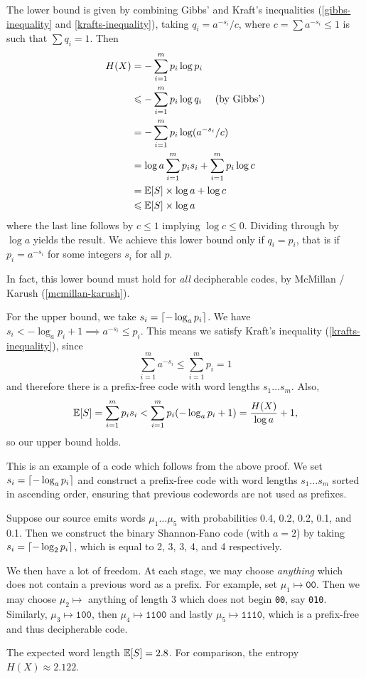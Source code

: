 \documentclass{article}
\begin{document}
\begin{prf}
    The lower bound is given by combining Gibbs' and Kraft's inequalities (\ref{gibbs-inequality} and \ref{krafts-inequality}), taking $q_i = a^{-s_i}/c$, where $c = \sum a^{-s_i} \leq 1$ is such that $\sum q_i = 1$. Then
    \begin{align*}
    	H(X) &= - \sum_{i=1}^m p_i \log p_i \\
    	&\leqslant - \sum_{i=1}^m p_i \log q_i \quad \text{ (by Gibbs')} \\
    	&= - \sum_{i=1}^m p_i \log (a^{-s_i}/c) \\
    	&= \log a \sum_{i=1}^m p_i s_i + \sum_{i=1}^m p_i \log c \\
    	&= \mathbb{E}[S] \times \log a + \log c \\
    	&\leqslant  \mathbb{E}[S] \times \log a
	\end{align*}
	where the last line follows by $c \leq 1$ implying $\log c \leq 0$. Dividing through by $\log a$ yields the result.
	We achieve this lower bound only if $q_i = p_i$, that is if $p_i = a^{-s_i}$ for some integers $s_i$ for all $p$.
	
	In fact, this lower bound must hold for \textit{all} decipherable codes, by McMillan / Karush (\ref{mcmillan-karush}).
	
	For the upper bound, we take $s_i = \left\lceil-\log_a p_i\right\rceil$. We have $s_i < - \log_a p_i + 1 \implies a^{-s_i} \leq p_i$. This means we satisfy Kraft's inequality (\ref{krafts-inequality}), since
	\[
	\sum_{i=1}^m a^{-s_i} \leq \sum_{i=1}^m p_i = 1
	\]
	and therefore there is a prefix-free code with word lengths $s_1 \dots s_m$. Also,
	\[
	\mathbb{E}[S] = \sum_{i=1}^m p_i s_i < \sum_{i=1}^m p_i (-\log_a p_i + 1) = \frac{H(X)}{\log a} + 1,
	\]
	so our upper bound holds.
\end{prf}

\begin{example}
    This is an example of a code which follows from the above proof. We set $s_i = \left\lceil- \log_a p_i\right\rceil$ and construct a prefix-free code with word lengths $s_1 \dots s_m$ sorted in ascending order, ensuring that previous codewords are not used as prefixes.
    
    Suppose our source emits words $\mu_1 \dots \mu_5$ with probabilities 0.4, 0.2, 0.2, 0.1, and 0.1. Then we construct the binary Shannon-Fano code (with $a=2$) by taking $s_i = \left\lceil-\log_2 p_i\right\rceil$, which is equal to 2, 3, 3, 4, and 4 respectively.
    
    We then have a lot of freedom. At each stage, we may choose \textit{anything} which does not contain a previous word as a prefix. For example, set $\mu_1 \mapsto \texttt{00}$. Then we may choose $\mu_2 \mapsto$ anything of length 3 which does not begin \texttt{00}, say \texttt{010}. Similarly, $\mu_3 \mapsto \texttt{100}$, then $\mu_4 \mapsto \texttt{1100}$ and lastly $\mu_5 \mapsto \texttt{1110}$, which is a prefix-free and thus decipherable code.
    
    The expected word length $\mathbb{E}[S] = 2.8$. For comparison, the entropy $H(X) \approx 2.122$.
\end{example}
\end{document}
